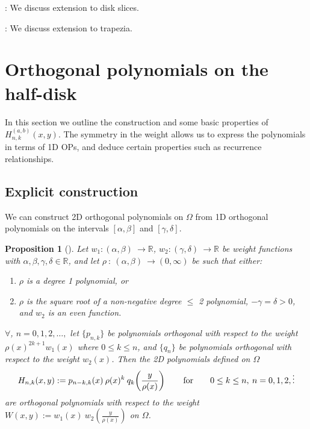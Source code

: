 \documentclass[11pt, oneside]{article}   	%
\newcommand{\R}{\mathbb{R}}
\newcommand{\hdop}{H}
\newcommand{\hdopnk}{\hdop_{n,k}}
\newcommand{\hdopnkab}{\hdop_{n,k}^{(a,b)}}
\newtheorem{proposition}{Proposition}
\begin{document}
\noindent{}: We discuss extension to disk slices.

\noindent{}: We discuss extension to trapezia.


\section{Orthogonal polynomials on the half-disk}\label{Section:OPs}

In this section we outline the construction and some basic properties of $\hdopnkab(x,y)$. The symmetry in the weight allows us to express the polynomials in terms of 1D OPs, and deduce certain properties such as recurrence relationships. 

\subsection{Explicit construction}

We can construct 2D orthogonal polynomials on $\Omega$ from 1D orthogonal polynomials on the intervals \([\alpha,\beta]\) and \([\gamma,\delta]\). 

\begin{proposition}[{\cite[p55--56]{dunkl2014orthogonal}}]\label{prop:construction}
Let \(w_1 : (\alpha,\beta) \: \to \R\), \(w_2 : (\gamma,\delta) \: \to \R\) be weight functions with \(\alpha,\beta,\gamma,\delta \in \R\), and let \(\rho \: : \: (\alpha,\beta) \: \to (0,\infty)\) be such that either:
\begin{enumerate}
\item  \(\rho\) is a degree 1 polynomial, or 
\item \(\rho\) is the square root of a non-negative degree \(\le\) 2 polynomial, \(-\gamma = \delta > 0\), and \(w_2\) is an even function.
\end{enumerate}
$\forall$, $n = 0,1,2,\dots, $ let $\{p_{n,k}\}$ be polynomials orthogonal with respect to the weight $\rho(x)^{2k+1} w_1(x)$ where $0 \le k \le n$, and $\{q_{n}\}$ be polynomials orthogonal with respect to the weight $w_2(x)$. Then the 2D polynomials defined on $\Omega$
$$
\hdopnk(x,y) := p_{n-k,k}(x) \: \rho(x)^k \: q_k\fpr(\frac{y}{\rho(x)}) \qquad\hbox{for} \qquad 0 \le k \le n, \: n = 0,1,2,\dots
$$
are orthogonal polynomials with respect to the weight \(W(x,y) := w_1(x) \: w_2(\frac{y}{\rho(x)}) \) on $\Omega$. 
\end{proposition}
\end{document}

